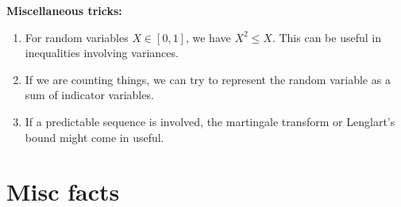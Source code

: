 \documentclass[twoside]{article}
\begin{document}
\textbf{Miscellaneous tricks:}
\begin{enumerate}
\item For random variables $X \in [0,1]$, we have $X^2 \leq X$. This can be useful in inequalities involving variances.

\item If we are counting things, we can try to represent the random variable as a sum of indicator variables.

\item If a predictable sequence is involved, the martingale transform or Lenglart's bound might come in useful.

\end{enumerate}

\section*{Misc facts}
\end{document}

